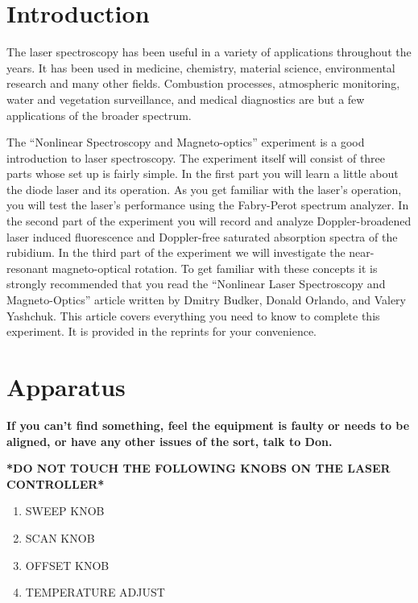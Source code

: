 \documentclass{../lab}
\begin{document}
\section{Introduction}

The laser spectroscopy has been useful in a variety of applications throughout the years. It has been used in medicine, chemistry, material science, environmental research and many other fields. Combustion processes, atmospheric monitoring, water and vegetation surveillance, and medical diagnostics are but a few applications of the broader spectrum.

The ``Nonlinear Spectroscopy and Magneto-optics'' experiment is a good introduction to laser spectroscopy. The experiment itself will consist of three parts whose set up is fairly simple. In the first part you will learn a little about the diode laser and its operation. As you get familiar with the laser's operation, you will test the laser's performance using the Fabry-Perot spectrum analyzer. In the second part of the experiment you will record and analyze Doppler-broadened laser induced fluorescence and Doppler-free saturated absorption spectra of the rubidium. In the third part of the experiment we will investigate the near-resonant magneto-optical rotation. To get familiar with these concepts it is strongly recommended that you read the ``Nonlinear Laser Spectroscopy and Magneto-Optics'' article written by Dmitry Budker, Donald Orlando, and Valery Yashchuk. This article covers everything you need to know to complete this experiment. It is provided in the reprints for your convenience.

\section{Apparatus}

\textbf{If you can't find something, feel the equipment is faulty or needs to be aligned, or have any other issues of the sort, talk to Don. }

\textbf{*DO NOT TOUCH THE FOLLOWING KNOBS ON THE LASER CONTROLLER*}

\begin{enumerate}
    \item SWEEP KNOB

    \item SCAN KNOB

    \item OFFSET KNOB

    \item TEMPERATURE ADJUST

\end{enumerate}
\end{document}
